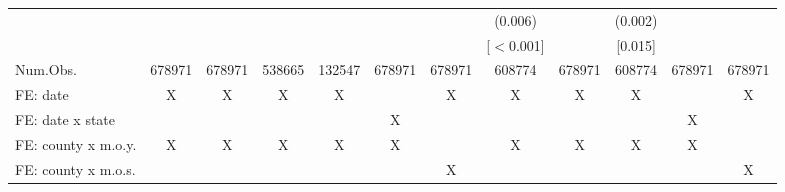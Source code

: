 \begin{sidewaystable}
\begin{tabular}[t]{lccccccc | cccc}
 &  &  &  &  &  &  & (0.006) &  & (0.002) &  & \\
 &  &  &  &  &  &  & {}[$<$0.001] &  & {}[0.015] &  & \\\hline
Num.Obs. & 678971 & 678971 & 538665 & 132547 & 678971 & 678971 & 608774 & 678971 & 608774 & 678971 & 678971\\
FE: date & X & X & X & X &  & X & X & X & X &  & X\\
FE: date x state &  &  &  &  & X &  &  &  &  & X & \\
FE: county x m.o.y. & X & X & X & X & X &  & X & X & X & X & \\
FE: county x m.o.s. &  &  &  &  &  & X &  &  &  &  & X\\
\hline
\end{tabular}
\end{sidewaystable}
